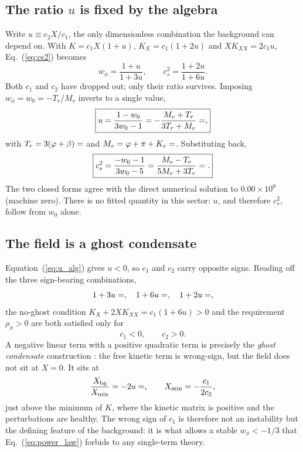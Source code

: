 \documentclass[12pt,a4paper]{article}
\newcommand{\phiG}{\varphi}
\begin{document}
\subsection{The ratio $u$ is fixed by the algebra}

Write $u \equiv c_2 X / c_1$, the only dimensionless combination the
background can depend on.  With $K = c_1X(1+u)$, $K_X = c_1(1+2u)$ and
$XK_{XX} = 2c_1 u$, Eq.~(\ref{eq:cs2}) becomes
%
\begin{equation}
  w_\phi = \frac{1+u}{1+3u},
  \qquad
  c_s^{2} = \frac{1+2u}{1+6u}.
  \label{eq:w_cs_of_u}
\end{equation}
%
Both $c_1$ and $c_2$ have dropped out; only their ratio survives.
Imposing $w_\phi = w_0 = -T_r/M_v$ inverts to a single value,
%
\begin{equation}
  \boxed{
  u = \frac{1-w_0}{3w_0-1}
    = -\frac{M_v+T_r}{3T_r+M_v}
    = \val{u_condensado_d12},}
  \label{eq:u_alg}
\end{equation}
%
with $T_r = 3(\phiG+\beta) = \val{T_R_d6}$ and
$M_v = \phiG+\pi+K_v = \val{M_V_d6}$.  Substituting back,
%
\begin{equation}
  \boxed{
  c_s^{2} = \frac{-w_0-1}{3w_0-5}
          = \frac{M_v-T_r}{5M_v+3T_r}
          = \val{cs2_condensado_d12}.}
  \label{eq:cs2_alg}
\end{equation}
%
The two closed forms agree with the direct numerical solution to
$0.00\times10^{0}$ (machine zero).  There is no fitted quantity in this
sector: $u$, and therefore $c_s^2$, follow from $w_0$ alone.

\subsection{The field is a ghost condensate}

Equation~(\ref{eq:u_alg}) gives $u<0$, so $c_1$ and $c_2$ carry opposite
signs.  Reading off the three sign-bearing combinations,
%
\begin{equation}
  1+3u = \val{uno_mas_3u_d6},\quad
  1+6u = \val{uno_mas_6u_d6},\quad
  1+2u = \val{uno_mas_2u_d6},
\end{equation}
%
the no-ghost condition $K_X+2XK_{XX} = c_1(1+6u) > 0$ and the requirement
$\rho_\phi>0$ are both satisfied only for
%
\begin{equation}
  c_1 < 0, \qquad c_2 > 0.
\end{equation}
%
A negative linear term with a positive quadratic term is precisely the
\emph{ghost condensate} construction \citep{ArkaniHamed2004}: the free
kinetic term is wrong-sign, but the field does not sit at $X=0$.  It sits
at
%
\begin{equation}
  \frac{X_{\rm bg}}{X_{\min}} = -2u = \val{X_sobre_Xmin_d6},
  \qquad X_{\min} = -\frac{c_1}{2c_2},
  \label{eq:condensate}
\end{equation}
%
just above the minimum of $K$, where the kinetic matrix is positive and
the perturbations are healthy.  The wrong sign of $c_1$ is therefore not
an instability but the defining feature of the background: it is what
allows a stable $w_\phi<-1/3$ that Eq.~(\ref{eq:power_law}) forbids to
any single-term theory.
\end{document}
